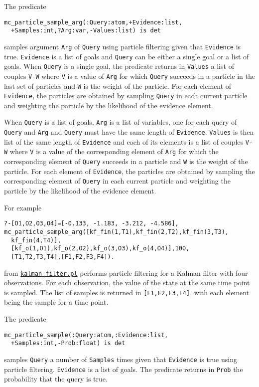 The predicate
\begin{verbatim}
mc_particle_sample_arg(:Query:atom,+Evidence:list,
  +Samples:int,?Arg:var,-Values:list) is det
\end{verbatim}
samples argument \verb|Arg| of \verb|Query| using particle filtering
given that
\verb|Evidence|
is true. \verb|Evidence| is a list of goals and \verb|Query| can be either
a single goal or a list of goals.
When \verb|Query| is a single goal, the predicate returns in \verb|Values| a list of couples \verb|V-W| where
\verb|V| is a value of \verb|Arg| for which \verb|Query| succeeds in
a particle in the last set of particles and \verb|W| is the weight of the particle.
For each element of \verb|Evidence|, the particles are obtained by sampling \verb|Query|
in each current particle and weighting the particle by the likelihood of the evidence element.

When \verb|Query| is a list of goals,  \verb|Arg| is a list of variables, one for
each query of \verb|Query| and \verb|Arg| and \verb|Query| must have the same length of \verb|Evidence|.
\verb|Values| is then list of the same length of \verb|Evidence| and each of its
elements is a list of couples \verb|V-W| where
\verb|V| is a value of the corresponding element of \verb|Arg| for which the corresponding element of
\verb|Query| succeeds in
a particle and \verb|W| is the weight of the particle.
For each element of \verb|Evidence|, the particles are obtained by sampling the corresponding element of \verb|Query|
in each current particle and weighting the particle by the likelihood of the evidence element.


For example
\begin{verbatim}
?-[O1,O2,O3,O4]=[-0.133, -1.183, -3.212, -4.586],
mc_particle_sample_arg([kf_fin(1,T1),kf_fin(2,T2),kf_fin(3,T3),
  kf_fin(4,T4)],
  [kf_o(1,O1),kf_o(2,O2),kf_o(3,O3),kf_o(4,O4)],100,
  [T1,T2,T3,T4],[F1,F2,F3,F4]).
\end{verbatim}
from \href{http://cplint.eu/example/inference/kalman_filter.pl}{\texttt{kalman\_filter.pl}} performs
particle filtering for a Kalman filter with four observations. For each observation, the value of the state
at the same time point is sampled. The list of samples is returned in \verb|[F1,F2,F3,F4]|, with each element
being the sample for a time point.

The predicate
\begin{verbatim}
mc_particle_sample(:Query:atom,:Evidence:list,
  +Samples:int,-Prob:float) is det
\end{verbatim}
samples \verb|Query|  a number of \verb|Samples| times given that
\verb|Evidence|
is true using particle filtering. \verb|Evidence| is a list of goals.
The predicate returns in \verb|Prob| the probability that the query is true.

